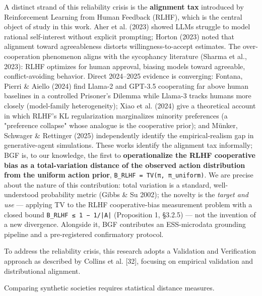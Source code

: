 A distinct strand of this reliability crisis is the \textbf{alignment tax} introduced by Reinforcement Learning from Human Feedback (RLHF), which is the central object of study in this work. Aher et al. (2023) showed LLMs struggle to model rational self-interest without explicit prompting; Horton (2023) noted that alignment toward agreeableness distorts willingness-to-accept estimates. The over-cooperation phenomenon aligns with the sycophancy literature (Sharma et al., 2023): RLHF optimizes for human approval, biasing models toward agreeable, conflict-avoiding behavior. Direct 2024–2025 evidence is converging: Fontana, Pierri \& Aiello (2024) find Llama-2 and GPT-3.5 cooperating far above human baselines in a controlled Prisoner's Dilemma while Llama-3 tracks humans more closely (model-family heterogeneity); Xiao et al. (2024) give a theoretical account in which RLHF's KL regularization marginalizes minority preferences (a "preference collapse" whose analogue is the cooperative prior); and Münker, Schwager \& Rettinger (2025) independently identify the empirical-realism gap in generative-agent simulations. These works identify the alignment tax informally; BGF is, to our knowledge, the first to \textbf{operationalize the RLHF cooperative bias as a total-variation distance of the observed action distribution from the uniform action prior}, \texttt{B\_RLHF = TV(π, π\_uniform)}. We are precise about the nature of this contribution: total variation is a standard, well-understood probability metric (Gibbs \& Su 2002); the novelty is the \textit{target and use} — applying TV to the RLHF cooperative-bias measurement problem with a closed bound \texttt{B\_RLHF ≤ 1 − 1/|A|} (Proposition 1, §3.2.5) — not the invention of a new divergence. Alongside it, BGF contributes an ESS-microdata grounding pipeline and a pre-registered confirmatory protocol.


To address the reliability crisis, this research adopts a Validation and Verification approach as described by Collins et al. [32], focusing on empirical validation and distributional alignment.


Comparing synthetic societies requires statistical distance measures.

